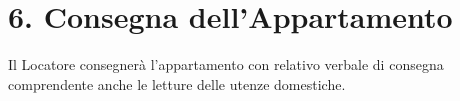 \section*{6. Consegna dell'Appartamento}
Il Locatore consegnerà l'appartamento con relativo verbale di consegna comprendente anche le letture delle utenze domestiche.
